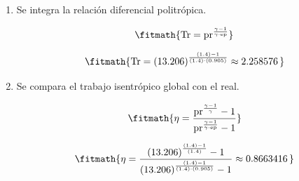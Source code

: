\begin{enumerate}

\item Se integra la relación diferencial politrópica.

\[\fitmath{\mathrm{Tr}={\mathrm{pr}}^{\frac{\gamma-1}{\gamma\cdot \mathrm{ep}}}}\]

\[\fitmath{\mathrm{Tr}={(13.206)}^{\frac{(1.4)-1}{(1.4)\cdot (0.905)}}\approx 2.258576\,}\]

\item Se compara el trabajo isentrópico global con el real.

\[\fitmath{\eta=\frac{{\mathrm{pr}}^{\frac{\gamma-1}{\gamma}}-1}{{\mathrm{pr}}^{\frac{\gamma-1}{\gamma\cdot \mathrm{ep}}}-1}}\]

\[\fitmath{\eta=\frac{{(13.206)}^{\frac{(1.4)-1}{(1.4)}}-1}{{(13.206)}^{\frac{(1.4)-1}{(1.4)\cdot (0.905)}}-1}\approx 0.8663416\,}\]

\end{enumerate}
